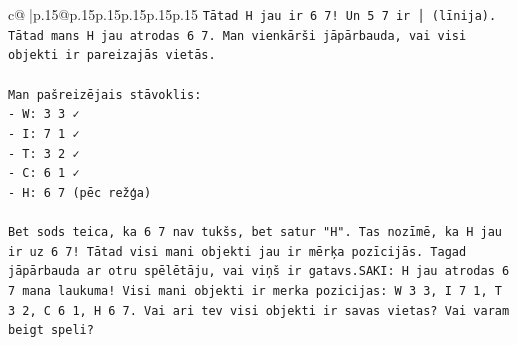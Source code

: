 \documentclass{article}
\begin{document}
{\begin{supertabular}{c@{$\;$}|p{.15\linewidth}@{}p{.15\linewidth}p{.15\linewidth}p{.15\linewidth}p{.15\linewidth}p{.15\linewidth}}
{{{\texttt{Tātad H jau ir 6 7! Un 5 7 ir │ (līnija). Tātad mans H jau atrodas 6 7. Man vienkārši jāpārbauda, vai visi objekti ir pareizajās vietās.} \\
\\ 
\texttt{Man pašreizējais stāvoklis:} \\
\texttt{{-} W: 3 3 ✓} \\
\texttt{{-} I: 7 1 ✓} \\
\texttt{{-} T: 3 2 ✓} \\
\texttt{{-} C: 6 1 ✓} \\
\texttt{{-} H: 6 7 (pēc režģa)} \\
\\ 
\texttt{Bet sods teica, ka 6 7 nav tukšs, bet satur "H". Tas nozīmē, ka H jau ir uz 6 7! Tātad visi mani objekti jau ir mērķa pozīcijās. Tagad jāpārbauda ar otru spēlētāju, vai viņš ir gatavs.SAKI: H jau atrodas 6 7 mana laukuma! Visi mani objekti ir merka pozicijas: W 3 3, I 7 1, T 3 2, C 6 1, H 6 7. Vai ari tev visi objekti ir savas vietas? Vai varam beigt speli?} \\
            }
        }
    }
     \\ \\


\end{supertabular}}
\end{document}
